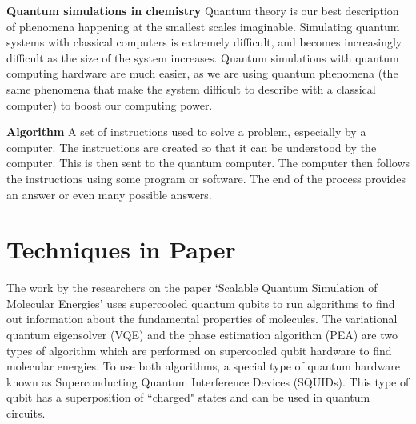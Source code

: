 \documentclass[14pt,landscape,color=UCLdarkred,margin=3cm]{uclposter}
\begin{document}
\begin{multicols}{3}
\begin{highlightbox}
\textbf{Quantum simulations in chemistry} Quantum theory is our best description of phenomena happening at the smallest scales imaginable. Simulating quantum systems with classical computers is extremely difficult, and becomes increasingly difficult as the size of the system increases. Quantum simulations with quantum computing hardware are much easier, as we are using quantum phenomena (the same phenomena that make the system difficult to describe with a classical computer) to boost our computing power.
\end{highlightbox}

\begin{highlightbox}
\textbf{Algorithm} A set of instructions used to solve a problem, especially by a computer. The instructions are created so that it can be understood by the computer. This is then sent to the quantum computer. The computer then follows the instructions using some program or software. The end of the process provides an answer or even many possible answers.
\end{highlightbox}

\columnbreak

\section*{Techniques in Paper}
The work by the researchers on the paper `Scalable Quantum Simulation of Molecular Energies' uses supercooled quantum qubits to run algorithms to find out information about the fundamental properties of molecules.
The variational quantum eigensolver (VQE) and the phase estimation algorithm (PEA) are two types of algorithm which are performed on supercooled qubit hardware to find molecular energies. To use both algorithms, a special type of quantum hardware known as Superconducting Quantum Interference Devices (SQUIDs). This type of qubit has a superposition of ``charged" states and can be used in quantum circuits.


\end{multicols}
\end{document}
